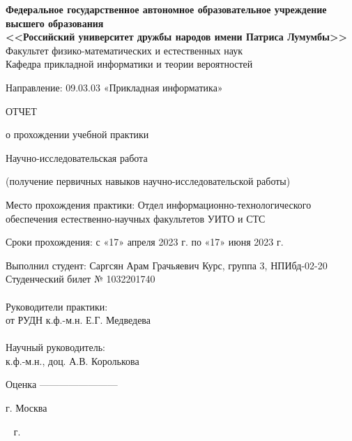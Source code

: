 \begin{titlepage}
  
  \begin{center}
    \textbf{%
      Федеральное государственное автономное образовательное
      учреждение высшего образования\\
      <<Российский университет дружбы народов имени Патриса Лумумбы>>}\\[5mm]
    Факультет физико-математических и естественных наук \\[2mm]
    Кафедра прикладной информатики и теории вероятностей

    \vfill

    
    
    \vfill

    Направление: 09.03.03 «Прикладная информатика»

    \vfill

    ОТЧЕТ

    \bigskip
    
    о прохождении учебной практики

    Научно-исследовательская работа
    
    (получение первичных навыков научно-исследовательской работы)

    \medskip
    
    Место прохождения практики:  Отдел информационно-технологического обеспечения естественно-научных факультетов УИТО и СТС
   
    Сроки прохождения: с «17» апреля 2023 г. по «17» июня 2023 г.
  \end{center}

\vfill

  \begin{minipage}{.45\textwidth}
    Выполнил студент: Саргсян Арам Грачьяевич
    Курс, группа 3, НПИбд-02-20\\
    Студенческий билет № 1032201740 \\ \\
    Руководители практики: \\
    от РУДН к.ф.-м.н. Е.Г. Медведева \\ \\
    
    Научный руководитель: \\
    к.ф.-м.н., доц. А.В. Королькова 
  \end{minipage}%
  \hfill
  
   
\vfill
Оценка ————————

\centering
г. Москва

\
 г.
\end{titlepage}
